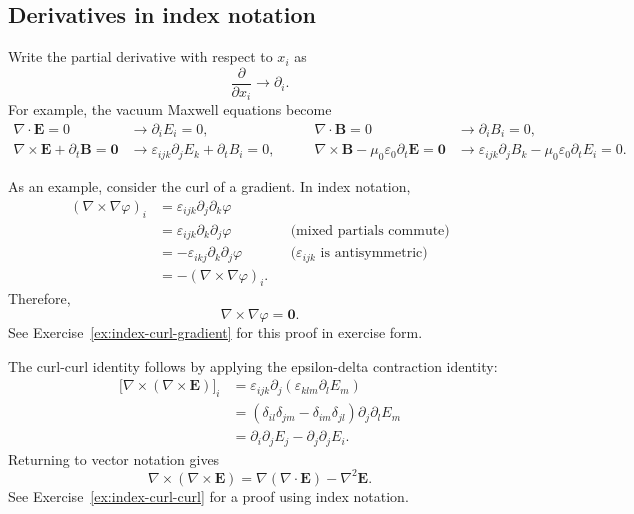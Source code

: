 \subsection{Derivatives in index notation}
Write the partial derivative with respect to $x_i$ as
\begin{equation}
\frac{\partial}{\partial x_i}\longrightarrow\partial_i.
\end{equation}
For example, the vacuum Maxwell equations become
\begin{equation}
\begin{aligned}
\nabla\cdot\mathbf{E}=0
&\longrightarrow \partial_iE_i=0,
&\qquad
\nabla\cdot\mathbf{B}=0
&\longrightarrow \partial_iB_i=0,\\
\nabla\times\mathbf{E}+\partial_t\mathbf{B}=\mathbf{0}
&\longrightarrow \varepsilon_{ijk}\partial_jE_k+\partial_tB_i=0,
&\qquad
\nabla\times\mathbf{B}-\mu_0\varepsilon_0\partial_t\mathbf{E}=\mathbf{0}
&\longrightarrow \varepsilon_{ijk}\partial_jB_k-\mu_0\varepsilon_0\partial_tE_i=0.
\end{aligned}
\end{equation}

As an example, consider the curl of a gradient. In index notation,
\begin{equation}
\begin{aligned}
(\nabla\times\nabla\varphi)_i
&=\varepsilon_{ijk}\partial_j\partial_k\varphi\\
&=\varepsilon_{ijk}\partial_k\partial_j\varphi
&&\text{(mixed partials commute)}\\
&=-\varepsilon_{ikj}\partial_k\partial_j\varphi
&&\text{($\varepsilon_{ijk}$ is antisymmetric)}\\
&=-(\nabla\times\nabla\varphi)_i.
\end{aligned}
\end{equation}
Therefore,
\begin{equation}
\nabla\times\nabla\varphi=\mathbf{0}.
\end{equation}
See Exercise~\ref{ex:index-curl-gradient} for this proof in exercise form.

The curl-curl identity follows by applying the epsilon-delta contraction identity:
\begin{equation}
\begin{aligned}
\bigl[\nabla\times(\nabla\times\mathbf{E})\bigr]_i
&=\varepsilon_{ijk}\partial_j
    \left(\varepsilon_{klm}\partial_lE_m\right)\\
&=(\delta_{il}\delta_{jm}-\delta_{im}\delta_{jl})
    \partial_j\partial_lE_m\\
&=\partial_i\partial_jE_j-\partial_j\partial_jE_i.
\end{aligned}
\end{equation}
Returning to vector notation gives
\begin{equation}
\nabla\times(\nabla\times\mathbf{E})
=\nabla(\nabla\cdot\mathbf{E})-\nabla^2\mathbf{E}.
\end{equation}
See Exercise~\ref{ex:index-curl-curl} for a proof using index notation.


